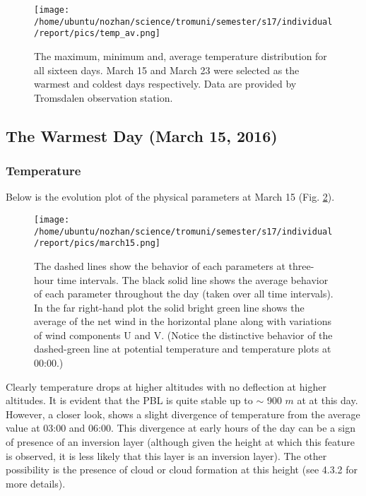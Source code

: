 \documentclass[a4paper,12pt]{article}
\numberwithin{equation}{section} %
\begin{document}
\vspace{2.5 cm}

\begin{figure}[bhp]
	\texttt{[image: /home/ubuntu/nozhan/science/tromuni/semester/s17/individual/report/pics/temp\_av.png]}
	\caption{The maximum, minimum and, average temperature distribution for all sixteen days. March 15 and March 23 were selected as the warmest and coldest days respectively. Data are provided by Tromsdalen observation station.}
	\label{warmcold}
\end{figure}


\subsection{The Warmest Day (March 15, 2016)}

\subsubsection{Temperature}

Below is the evolution plot of the physical parameters at March 15 (Fig. \ref{march15}).

\begin{figure}[bhp]
\texttt{[image: /home/ubuntu/nozhan/science/tromuni/semester/s17/individual/report/pics/march15.png]}
\caption{The dashed lines show the behavior of each parameters at three-hour time intervals. The black solid line shows the average behavior of each parameter throughout the day (taken over all time intervals). In the far right-hand plot the solid bright green line shows the average of the net wind in the horizontal plane along with variations of wind components U and V. (Notice the distinctive behavior of the dashed-green line at potential temperature and temperature plots at 00:00.)}
\label{march15}
\end{figure}

\vspace{1cm}

Clearly temperature drops at higher altitudes with no deflection at higher altitudes. It is evident that the PBL is quite stable up to $\sim$ 900 $m$ at at this day. However, a closer look, shows a slight divergence of temperature from the average value at 03:00 and 06:00. This divergence at early hours of the day can be a sign of presence of an inversion layer (although given the height at which this feature is observed, it is less likely that this layer is an inversion layer). The other possibility is the presence of cloud or cloud formation at this height (see 4.3.2 for more details). 
\end{document}
